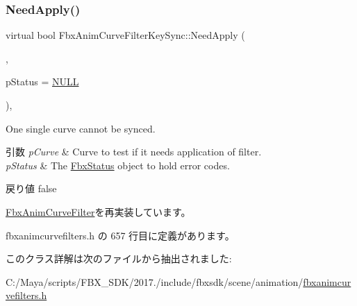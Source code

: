 \subsubsection{\texorpdfstring{Need\+Apply()}{NeedApply()}\hspace{0.1cm}{\footnotesize\ttfamily [5/5]}}
{\footnotesize\ttfamily virtual bool Fbx\+Anim\+Curve\+Filter\+Key\+Sync\+::\+Need\+Apply (\begin{DoxyParamCaption}\item[{\hyperlink{class_fbx_anim_curve}{Fbx\+Anim\+Curve} \&}]{,  }\item[{\hyperlink{class_fbx_status}{Fbx\+Status} $\ast$}]{p\+Status = {\ttfamily \hyperlink{fbxarch_8h_a070d2ce7b6bb7e5c05602aa8c308d0c4}{N\+U\+LL}} }\end{DoxyParamCaption})\hspace{0.3cm}{\ttfamily [inline]}, {\ttfamily [virtual]}}

One single curve cannot be sync\textquotesingle{}ed. 
\begin{DoxyParams}{引数}
{\em p\+Curve} & Curve to test if it needs application of filter. \\
\hline
{\em p\+Status} & The \hyperlink{class_fbx_status}{Fbx\+Status} object to hold error codes. \\
\hline
\end{DoxyParams}
\begin{DoxyReturn}{戻り値}
{\ttfamily false} 
\end{DoxyReturn}


\hyperlink{class_fbx_anim_curve_filter_af768a9c47e4f5a5fff47a8ec781e6b4c}{Fbx\+Anim\+Curve\+Filter}を再実装しています。



 fbxanimcurvefilters.\+h の 657 行目に定義があります。



このクラス詳解は次のファイルから抽出されました\+:\begin{DoxyCompactItemize}
\item 
C\+:/\+Maya/scripts/\+F\+B\+X\+\_\+\+S\+D\+K/2017./include/fbxsdk/scene/animation/\hyperlink{fbxanimcurvefilters_8h}{fbxanimcurvefilters.\+h}\end{DoxyCompactItemize}
